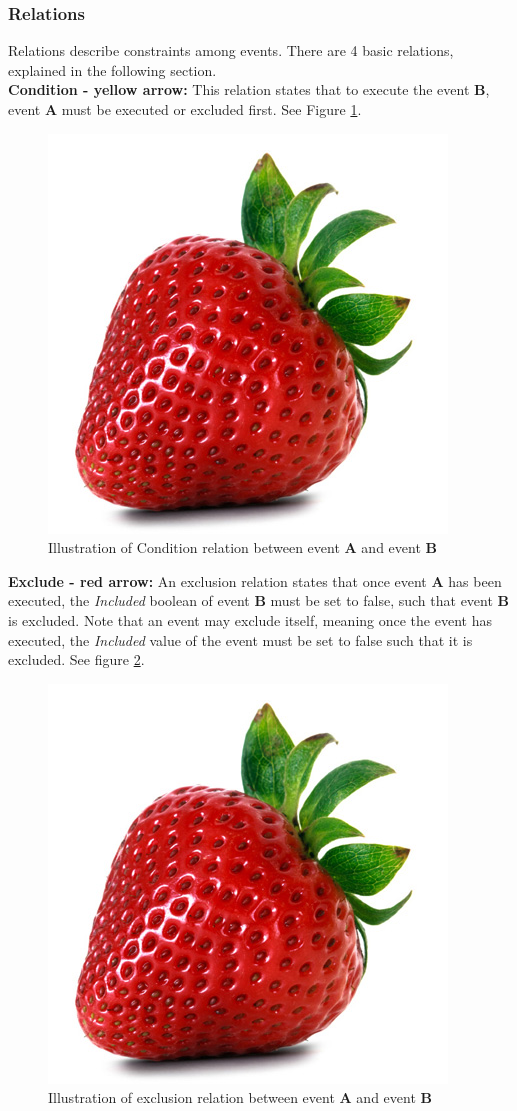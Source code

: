 \subsubsection{Relations}
Relations describe constraints among events. There are 4 basic relations, explained in the following section. \\

\textbf{Condition - yellow arrow:} This relation states that to execute the event \textbf{B}, event \textbf{A} must be executed or excluded first. See Figure \ref{fig:ConditionRelation}.

\begin{figure}[H!]
\centering
\includegraphics[width=0.5\linewidth]{Figures/strawberry}
\caption{\label{fig:ConditionRelation} Illustration of Condition relation between event \textbf{A} and event \textbf{B}}
\end{figure} 

\textbf{Exclude - red arrow:} An exclusion relation states that once event \textbf{A} has been executed, the \textit{Included} boolean of event \textbf{B} must be set to false, such that event \textbf{B} is excluded. Note that an event may exclude itself, meaning once the event has executed, the \textit{Included} value of the event must be set to false such that it is excluded.  See figure \ref{fig:ExclusionRelation}.

\begin{figure}[H!]
\centering
\includegraphics[width=0.5\linewidth]{Figures/strawberry}
\caption{\label{fig:ExclusionRelation} Illustration of exclusion relation between event \textbf{A} and event \textbf{B}}
\end{figure} 


